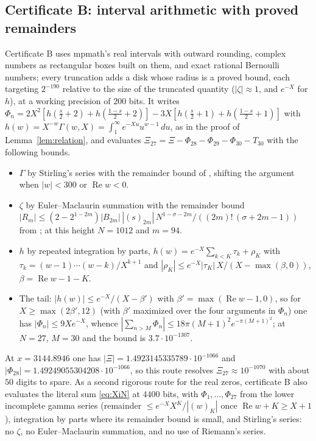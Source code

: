 \documentclass[11pt]{article}
\theoremstyle{plain}
\theoremstyle{definition}
\theoremstyle{remark}
\newcommand{\re}{\operatorname{Re}}
\begin{document}
\subsection{Certificate B: interval arithmetic with proved remainders}

Certificate B uses mpmath's real intervals with outward rounding, complex
numbers as rectangular boxes built on them, and exact rational Bernoulli
numbers; every truncation adds a disk whose radius is a proved bound, each
targeting $2^{-190}$ relative to the size of the truncated quantity ($|\zeta| \approx 1$,
and $e^{-X}$ for $h$), at a working precision of $200$ bits. It writes
$\Phi_n = 2X^2[h(\tfrac s2 + 2) + h(\tfrac{1-s}2 + 2)] - 3X[h(\tfrac s2 + 1) +
h(\tfrac{1-s}2 + 1)]$ with $h(w) = X^{-w}\Gamma(w, X) = \int_1^\infty
e^{-Xu}u^{w-1}\,du$, as in the proof of Lemma~\ref{lem:relation}, and evaluates
$\Xi_{27} = \Xi - \Phi_{28} - \Phi_{29} - \Phi_{30} - T_{30}$ with the following
bounds.
\begin{itemize}
\item $\Gamma$ by Stirling's series with the remainder bound of
\cite[5.11.1, \S5.11(ii)]{DLMF}, shifting the argument when $|w| < 300$ or
$\re w < 0$.
\item $\zeta$ by Euler--Maclaurin summation \cite[2.10.1]{DLMF} with the
remainder bound
$|R_m| \le (2 - 2^{1-2m})|B_{2m}|\,|(s)_{2m}|\,N^{1-\sigma-2m}/((2m)!\,
(\sigma + 2m - 1))$ from \cite[24.9.2]{DLMF}; at this height $N = 1012$ and
$m = 94$.
\item $h$ by repeated integration by parts,
$h(w) = e^{-X}\sum_{k<K}\tau_k + \rho_K$ with
$\tau_k = (w-1)\cdots(w-k)/X^{k+1}$ and
$|\rho_K| \le e^{-X}|\tau_K|\,X/(X - \max(\beta, 0))$, $\beta = \re w - 1 - K$.
\item The tail: $|h(w)| \le e^{-X}/(X - \beta')$ with $\beta' = \max(\re w - 1,
0)$, so for $X \ge \max(2\beta', 12)$ (with $\beta'$ maximized over the four
arguments in $\Phi_n$) one has $|\Phi_n| \le 9Xe^{-X}$, whence
$|\sum_{n>M}\Phi_n| \le 18\pi(M+1)^2e^{-\pi(M+1)^2}$; at $N = 27$, $M = 30$ and
the bound is $3.7\cdot10^{-1307}$.
\end{itemize}
At $x = 3144.8946$ one has $|\Xi| = 1.4923145335789\cdot10^{-1066}$ and
$|\Phi_{28}| = 1.49249055304208\cdot10^{-1066}$, so this route resolves
$\Xi_{27} \approx 10^{-1070}$ with about $50$ digits to spare. As a second
rigorous route for the real zeros, certificate B also evaluates the literal sum
\eqref{eq:XiN} at $4400$ bits, with $\Phi_1, \ldots, \Phi_{27}$ from the lower
incomplete gamma series (remainder $\le e^{-X}X^K/|(w)_K|$ once
$\re w + K \ge X + 1$), integration by parts where its remainder bound is small, and Stirling's
series: no $\zeta$, no Euler--Maclaurin summation, and no use of Riemann's
series.
\end{document}
